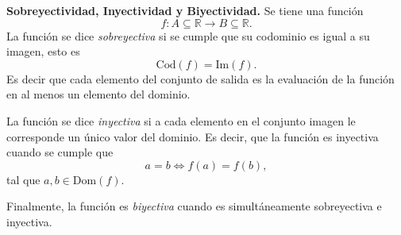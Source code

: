 \begin{definition}\textbf{Sobreyectividad, Inyectividad y Biyectividad.}
    Se tiene una función
    \begin{equation*}
        f: A \subseteq \mathbb{R} \rightarrow B \subseteq \mathbb{R}.
    \end{equation*}
    La función se dice \textit{sobreyectiva} si se cumple que su codominio es igual a su imagen, esto es
    \begin{equation*}
        \text{Cod}(f)=\text{Im}(f).
    \end{equation*}
    Es decir que cada elemento del conjunto de salida es la evaluación de la función en al menos un elemento del
    dominio.

    La función se dice \textit{inyectiva} si a cada elemento en el conjunto imagen le corresponde un único
    valor del dominio. Es decir, que la función es inyectiva cuando se cumple que
    \begin{equation*}
        a=b \iff f(a)=f(b),
    \end{equation*}
    tal que $a,b\in \text{Dom}(f)$.

    Finalmente, la función es \textit{biyectiva} cuando es simultáneamente sobreyectiva e inyectiva.
\end{definition}